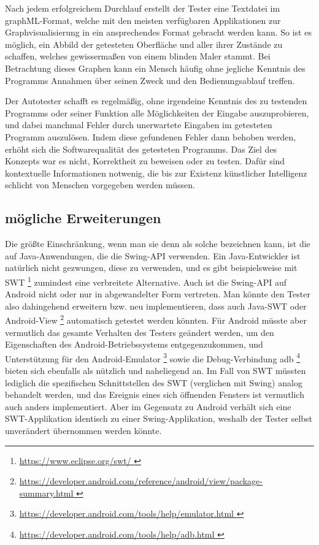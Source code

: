Nach jedem erfolgreichem Durchlauf erstellt der Tester
eine Textdatei im graphML-Format, welche mit den meisten
verfügbaren Applikationen zur Graphvisualisierung in ein
ansprechendes Format gebracht werden kann. So ist es möglich,
ein Abbild der getesteten Oberfläche und aller ihrer Zustände 
zu schaffen, welches gewissermaßen von einem blinden Maler stammt.
Bei Betrachtung dieses Graphen kann ein Mensch häufig
ohne jegliche Kenntnis des Programms Annahmen über seinen Zweck
und den Bedienungsablauf treffen.

Der Autotester schafft es regelmäßig, ohne irgendeine Kenntnis des zu
testenden Programms oder seiner Funktion alle Möglichkeiten
der Eingabe auszuprobieren, und dabei manchmal Fehler durch unerwartete
Eingaben im getesteten Programm auszulösen.
Indem diese gefundenen Fehler dann behoben werden, erhöht sich die
Softwarequalität des getesteten Programms. Das Ziel des Konzepts
war es nicht, Korrektheit zu beweisen oder zu testen. Dafür
sind kontextuelle Informationen notwenig, die bis zur Existenz
künstlicher Intelligenz schlicht von Menschen vorgegeben werden müssen.


\subsection{mögliche Erweiterungen}

Die größte Einschränkung, wenn man sie denn als solche bezeichnen
kann, ist die auf Java-Anwendungen, die die Swing-API verwenden.
Ein Java-Entwickler ist natürlich nicht gezwungen, diese zu verwenden,
und es gibt beispielsweise mit SWT
\footnote{ \url{ https://www.eclipse.org/swt/ }} zumindest eine 
verbreitete Alternative. Auch ist die Swing-API auf Android
nicht oder nur in abgewandelter Form vertreten. Man könnte
den Tester also dahingehend erweitern bzw. neu implementieren,
dass auch Java-SWT oder Android-View
\footnote{ \url{ https://developer.android.com/reference/android/view/package-summary.html }} 
automatisch getestet werden könnten. Für Android müsste aber
vermutlich das gesamte Verhalten des Testers geändert werden,
um den Eigenschaften des Android-Betriebssystems entgegenzukommen,
und Unterstützung für den Android-Emulator
\footnote{ \url{ https://developer.android.com/tools/help/emulator.html }} 
sowie die Debug-Verbindung adb
\footnote{ \url{ https://developer.android.com/tools/help/adb.html }} 
bieten sich ebenfalls als nützlich und naheliegend an.
Im Fall von SWT müssten lediglich die spezifischen Schnittstellen
des SWT (verglichen mit Swing) analog behandelt werden, und 
das Ereignis eines sich öffnenden Fensters ist vermutlich auch
anders implementiert. Aber im Gegensatz zu Android verhält
sich eine SWT-Applikation identisch zu einer Swing-Applikation,
weshalb der Tester selbst unverändert übernommen werden könnte.

